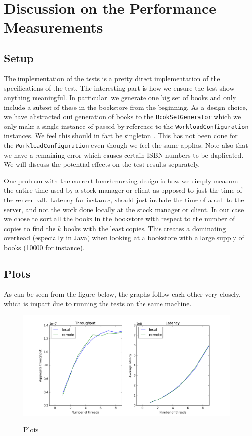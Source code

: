 
\section{Discussion on the Performance Measurements}

\subsection{Setup}
The implementation of the tests is a pretty direct implementation of the
specifications of the test. The interesting part is how we ensure the test
show anything meaningful. In particular, we generate one big set of books and
only include a subset of these in the bookstore from the beginning. As a
design choice, we have abstracted out generation of books to the
{\tt BookSetGenerator} which we only make a single instance of passed by
reference to the {\tt WorkloadConfiguration} instances. We feel this should in
fact be singleton . This has
not been done for the {\tt WorkloadConfiguration} even though we feel the same
applies. Note also that we have a remaining error which causes certain ISBN
numbers to be duplicated. We will discuss the potential effects on the test
results separately.

One problem with the current benchmarking design is how we simply measure the
entire time used by a stock manager or client as opposed to just the time of
the server call. Latency for instance, should just include the time of a call
to the server, and not the work done locally at the stock
manager or client. In our case we chose to sort all the books in the bookstore
with respect to the number of copies to find the $k$ books with the least
copies. This creates a dominating overhead (especially in Java) when looking
at a bookstore with a large supply of books (10000 for instance).

\subsection{Plots}
As can be seen from the figure below, the graphs follow each other very closely,
which is impart due to running the tests on the same machine.
\begin{figure}[H]
    \centering
    \includegraphics[scale=0.5]{plots.png}
    \label{fig:plots}
    \caption{Plots}
\end{figure}


